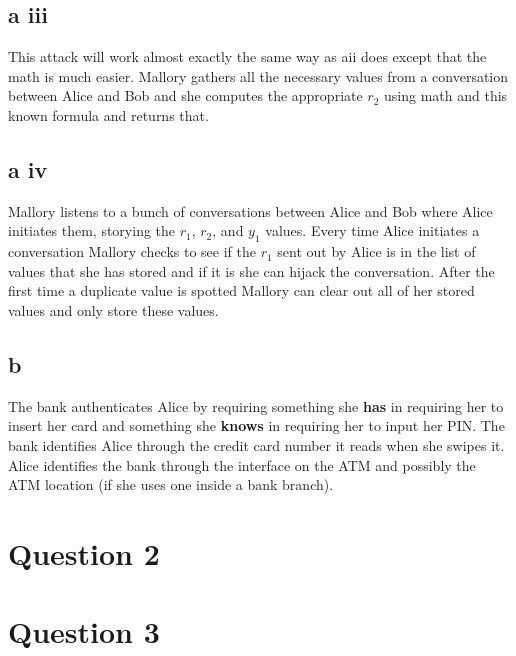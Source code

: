 \documentclass{article}
\begin{document}
	\subsection*{a iii} %
	\label{sub:a_iii}
	This attack will work almost exactly the same way as aii does except that the math is much easier. Mallory gathers all the necessary values from a conversation between Alice and Bob and she computes the appropriate $r_2$ using math and this known formula and returns that.


	\subsection*{a iv} %
	\label{sub:a_iv}
	Mallory listens to a bunch of conversations between Alice and Bob where Alice initiates them, storying the $r_1$, $r_2$, and $y_1$ values. Every time Alice initiates a conversation Mallory checks to see if the $r_1$ sent out by Alice is in the list of values that she has stored and if it is she can hijack the conversation. After the first time a duplicate value is spotted Mallory can clear out all of her stored values and only store these values.



	\subsection*{b} %
	\label{sub:b}
	The bank authenticates Alice by requiring something she \textbf{has} in requiring her to insert her card and something she \textbf{knows} in requiring her to input her PIN. The bank identifies Alice through the credit card number it reads when she swipes it. Alice identifies the bank through the interface on the ATM and possibly the ATM location (if she uses one inside a bank branch).



\section*{Question 2} %
\label{sec:question_2}





\section*{Question 3} %
\label{sec:question_3}
\end{document}
